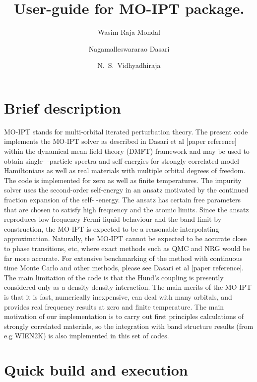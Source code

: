 \documentclass[a4paper]{article}
\begin{document}
\title{\bf User-guide for MO-IPT package.}
\author{Wasim Raja Mondal}
\author{Nagamalleswararao Dasari} 
\author{N.\ S.\ Vidhyadhiraja}
\maketitle

\section{Brief description}
MO-IPT stands for multi-orbital iterated perturbation theory. The present code
implements the MO-IPT solver as described in Dasari et al [paper reference] within
the dynamical mean field theory (DMFT) framework and may be used to obtain single-
-particle spectra and self-energies for strongly correlated model Hamiltonians as
well as real materials with multiple orbital degrees of freedom. The code is implemented
for zero as well as finite temperatures. The impurity solver uses the second-order
self-energy in an ansatz motivated by the continued fraction expansion of the self-
-energy. The ansatz has certain free parameters that are chosen to satisfy high
frequency and the atomic limits. Since the ansatz reproduces low frequency Fermi liquid
behaviour and the band limit by construction, the MO-IPT is expected to be a reasonable
interpolating approximation. Naturally, the MO-IPT cannot be expected to be accurate
close to phase transitions, etc, where exact methods such as QMC and NRG would be
far more accurate. For extensive benchmarking of the method with continuous time
Monte Carlo and other methods, please see Dasari et al [paper reference]. The main
limitation of the code is that the Hund's coupling is presently considered only as
a density-density interaction. The main merits of the MO-IPT is that it is fast,
numerically inexpensive, can deal with many orbitals, and provides real frequency
results at zero and finite temperature. The main motivation of our implementation
is to carry out first principles calculations of strongly correlated materials, so
the integration with band structure results (from e.g WIEN2K) is also implemented
in this set of codes.


\section{Quick build and execution}
\end{document}

